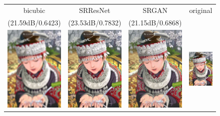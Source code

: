 \documentclass[10pt,twocolumn,letterpaper]{article}
\begin{document}
\begin{figure}[ht] 
  	\begin{tabular}{cccc}
  		 bicubic &  SRResNet  & SRGAN & original\\
   		 (21.59dB/0.6423) &   (23.53dB/0.7832) & (21.15dB/0.6868) & \\
     	\includegraphics[trim=0pt 0pt 0pt 0pt, clip, width=1.55in]{images/used/jpg/comic_SRF_4_bicubic} &
     	\includegraphics[trim=0pt 0pt 0pt 0pt, clip, width=1.55in]{images/used/jpg/comic_SRResNet-MSE} &
     	\includegraphics[trim=0pt 0pt 0pt 0pt, clip, width=1.55in]{images/used/jpg/comic_SRGAN-VGG54} &
     	\includegraphics[trim=0pt 0pt 0pt 0pt, clip, width=1.55in]{images/used/jpg/comic_HR.jpg} \\   	

\end{tabular}
\end{figure}
\end{document}
